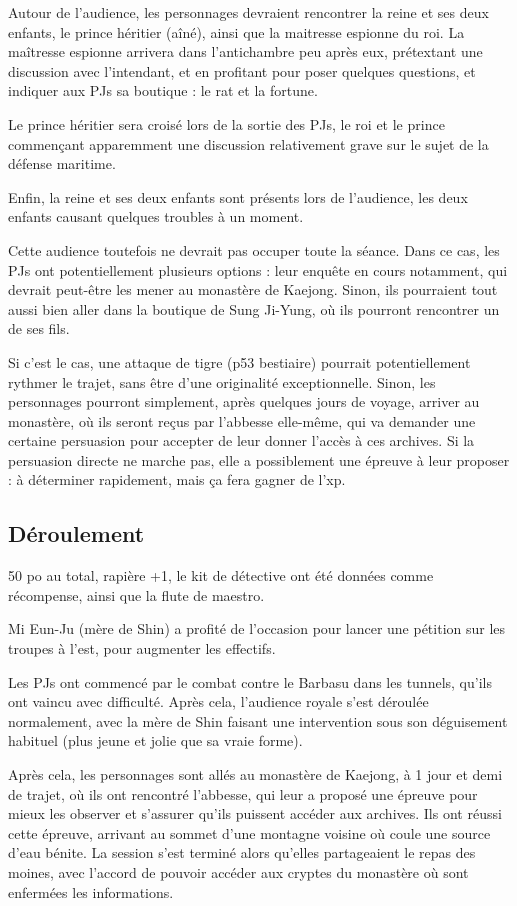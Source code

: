 \documentclass[10pt,a4paper]{book}
\begin{document}
Autour de l'audience, les personnages devraient rencontrer la reine et ses deux enfants, le prince héritier (aîné), ainsi que la maitresse espionne du roi. La maîtresse espionne arrivera dans l'antichambre peu après eux, prétextant une discussion avec l'intendant, et en profitant pour poser quelques questions, et indiquer aux PJs sa boutique : le rat et la fortune.

Le prince héritier sera croisé lors de la sortie des PJs, le roi et le prince commençant apparemment une discussion relativement grave sur le sujet de la défense maritime.

Enfin, la reine et ses deux enfants sont présents lors de l'audience, les deux enfants causant quelques troubles à un moment.


Cette audience toutefois ne devrait pas occuper toute la séance. Dans ce cas, les PJs ont potentiellement plusieurs options : leur enquête en cours notamment, qui devrait peut-être les mener au monastère de Kaejong. Sinon, ils pourraient tout aussi bien aller dans la boutique de Sung Ji-Yung, où ils pourront rencontrer un de ses fils.

Si c'est le cas, une attaque de tigre (p53 bestiaire) pourrait potentiellement rythmer le trajet, sans être d'une originalité exceptionnelle. Sinon, les personnages pourront simplement, après quelques jours de voyage, arriver au monastère, où ils seront reçus par l'abbesse elle-même, qui va demander une certaine persuasion pour accepter de leur donner l'accès à ces archives. Si la persuasion directe ne marche pas, elle a possiblement une épreuve à leur proposer : à déterminer rapidement, mais ça fera gagner de l'xp.

\subsection{Déroulement}
50 po au total, rapière +1, le kit de détective ont été données comme récompense, ainsi que la flute de maestro.

Mi Eun-Ju (mère de Shin) a profité de l'occasion pour lancer une pétition sur les troupes à l'est, pour augmenter les effectifs.

Les PJs ont commencé par le combat contre le Barbasu dans les tunnels, qu'ils ont vaincu avec difficulté. Après cela, l'audience royale s'est déroulée normalement, avec la mère de Shin faisant une intervention sous son déguisement habituel (plus jeune et jolie que sa vraie forme).

Après cela, les personnages sont allés au monastère de Kaejong, à 1 jour et demi de trajet, où ils ont rencontré l'abbesse, qui leur a proposé une épreuve pour mieux les observer et s'assurer qu'ils puissent accéder aux archives. Ils ont réussi cette épreuve, arrivant au sommet d'une montagne voisine où coule une source d'eau bénite. La session s'est terminé alors qu'elles partageaient le repas des moines, avec l'accord de pouvoir accéder aux cryptes du monastère où sont enfermées les informations.
\end{document}
